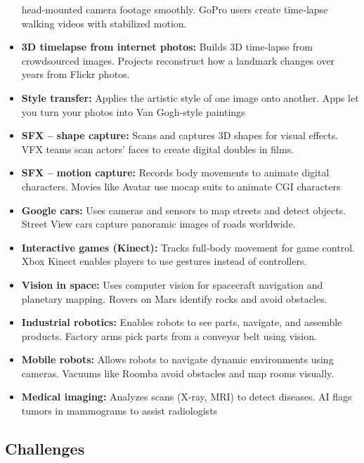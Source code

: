 \begin{itemize}
    head‑mounted camera footage smoothly. GoPro users create
    time‑lapse walking videos with stabilized motion.
  \item \textbf{3D timelapse from internet photos:} Builds 3D
    time‑lapse from crowdsourced images. Projects reconstruct how a
    landmark changes over years from Flickr photos.
  \item \textbf{Style transfer:} Applies the artistic style of one
    image onto another. Apps let you turn your photos into Van
    Gogh‑style paintings
  \item \textbf{SFX – shape capture:} Scans and captures 3D shapes
    for visual effects. VFX teams scan actors’ faces to create
    digital doubles in films.
  \item \textbf{SFX – motion capture:} Records body movements to
    animate digital characters. Movies like Avatar use mocap suits to
    animate CGI characters
  \item \textbf{Google cars:} Uses cameras and sensors to map streets
    and detect objects. Street View cars capture panoramic images of
    roads worldwide.
  \item \textbf{Interactive games (Kinect):} Tracks full‑body
    movement for game control. Xbox Kinect enables players to use
    gestures instead of controllers.
  \item \textbf{Vision in space:} Uses computer vision for spacecraft
    navigation and planetary mapping. Rovers on Mars identify rocks
    and avoid obstacles.
  \item \textbf{Industrial robotics:} Enables robots to see parts,
    navigate, and assemble products. Factory arms pick parts from a
    conveyor belt using vision.
  \item \textbf{Mobile robots:} Allows robots to navigate dynamic
    environments using cameras. Vacuums like Roomba avoid obstacles
    and map rooms visually.
  \item \textbf{Medical imaging:} Analyzes scans (X‑ray, MRI) to
    detect diseases. AI flags tumors in mammograms to assist
    radiologists
\end{itemize}

\subsection*{Challenges}

